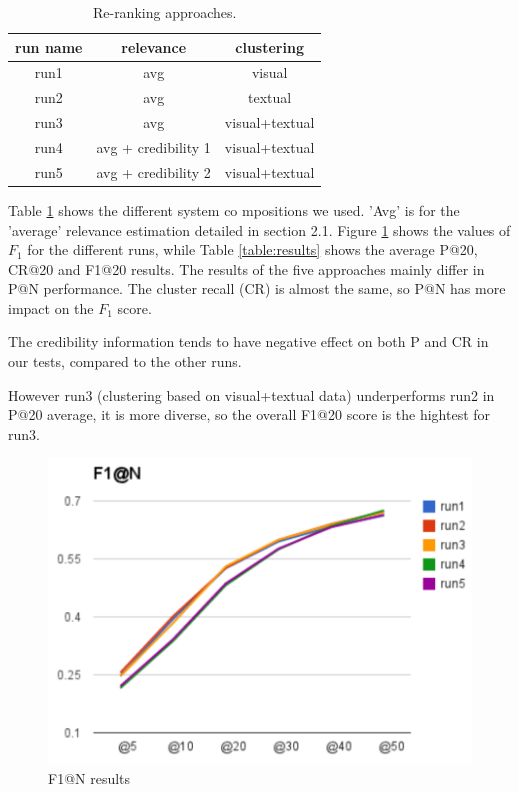 \documentclass{acm_proc_article-me}
\begin{document}
\begin{table}[t]
\centering
\caption{Re-ranking approaches.}
\begin{tabular}{|c|c|c|}
	\hline 
	run name & relevance & clustering\tabularnewline
	\hline 
	\hline 
	run1 & avg & visual\tabularnewline
	\hline 
	run2 & avg & textual\tabularnewline
	\hline 
	run3 & avg & visual+textual\tabularnewline
	\hline 
	run4 & avg + credibility 1 & visual+textual\tabularnewline
	\hline 
	run5 & avg + credibility 2 & visual+textual\tabularnewline
	\hline 
\end{tabular}
\label{table:runs}
\end{table}

Table \ref{table:runs} shows the different system co mpositions we used. 'Avg' is for the 'average' relevance estimation detailed in section 2.1.
Figure \ref{fig:p} shows the values of $F_1$ for the different runs, while Table \ref{table:results} shows the average P@20, CR@20 and F1@20 results. The results of the five approaches mainly differ in P@N performance. The cluster recall (CR) is almost the same, so P@N has more impact on the $F_1$ score.


The credibility information tends to have negative effect on both P and CR in our tests, compared to the other runs.

However run3 (clustering based on visual+textual data) underperforms run2 in P@20 average, it is more diverse, so the overall F1@20 score is the hightest for run3.

\begin{figure}[t]
\centering
\includegraphics[width=0.95\linewidth]{f1}
\caption{F1@N results}
\label{fig:p}
\end{figure}
\end{document}
